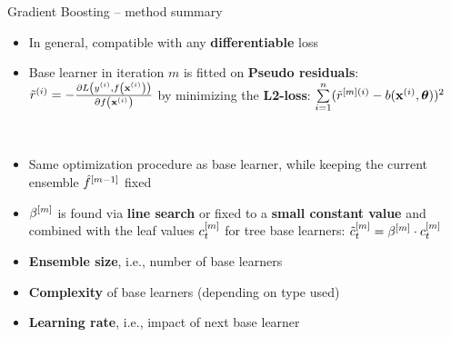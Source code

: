 \begin{frame}{Gradient Boosting -- method summary}

\footnotesize


\begin{itemize}
  \item In general, compatible with any \textbf{differentiable} loss
  \item Base learner in iteration $m$ is fitted on \textbf{Pseudo residuals}: $\tilde{r}^{(i)} = - \frac{\partial{L\left(y^{(i)}, f\left(\mathbf{x}^{(i)}\right)\right)}}{\partial f\left(\mathbf{x}^{(i)}\right)}$ by minimizing the \textbf{L2-loss}: $\sum\limits_{i=1}^n (\tilde{r}^{[m](i)} - b(\mathbf{x}^{(i)}, \bm{\theta}))^2$
\end{itemize}

\medskip

 ~~
\begin{itemize}
    \item Same optimization procedure as base learner, while keeping the current ensemble $\hat{f}^{[m-1]}$ fixed
    \item $\beta^{[m]}$ is found via \textbf{line search} or fixed to a \textbf{small constant value} and combined with the leaf values $c_t^{[m]}$ for tree base learners: $\tilde{c}_t^{[m]} = \beta^{[m]} \cdot c_t^{[m]}$
\end{itemize}

\medskip


\begin{itemize}
  \item \textbf{Ensemble size}, i.e., number of base learners
  \item \textbf{Complexity} of base learners (depending on type used)
  \item \textbf{Learning rate}, i.e., impact of next base learner
\end{itemize}

\medskip


\end{frame}


